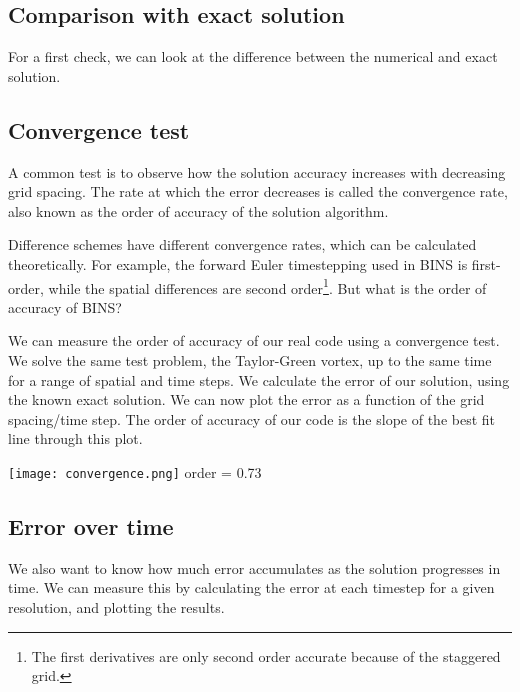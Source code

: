 \documentclass[12pt]{article}
\begin{document}
\subsection{Comparison with exact solution}
For a first check, we can look at the difference between the numerical and exact solution.

\subsection{Convergence test}
A common test is to observe how the solution accuracy increases with decreasing grid spacing.  The rate at which the error decreases is called the convergence rate, also known as the order of accuracy of the solution algorithm.  

Difference schemes have different convergence rates, which can be calculated theoretically.  For example, the forward Euler timestepping used in BINS is first-order, while the spatial differences are second order\footnote{The first derivatives are only second order accurate because of the staggered grid.}.  But what is the order of accuracy of BINS?

We can measure the order of accuracy of our real code using a convergence test.  We solve the same test problem, the Taylor-Green vortex, up to the same time for a range of spatial and time steps.  We calculate the error of our solution, using the known exact solution.  We can now plot the error as a function of the grid spacing/time step.  The order of accuracy of our code is the slope of the best fit line through this plot.

\texttt{[image: convergence.png]} 
order = 0.73

\subsection{Error over time}  
We also want to know how much error accumulates as the solution progresses in time.  We can measure this by calculating the error at each timestep for a given resolution, and plotting the results.
\end{document}
